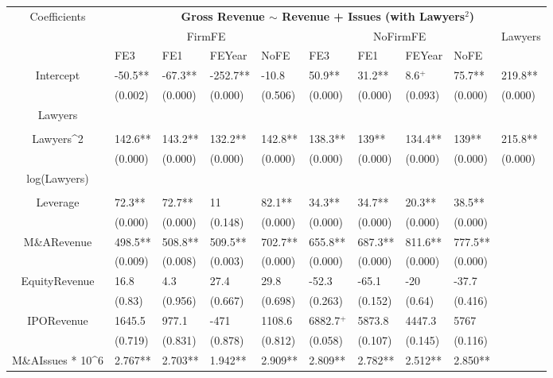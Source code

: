 \documentclass{article}
\begin{document}
\begin{table}[H]
\centering
\begin{tabular}{|clllllllll|}
\hline
\multirow{3}{*}{Coefficients} & \multicolumn{9}{c|}{\textbf{Gross Revenue $\sim$ Revenue + Issues (with Lawyers$^2$)}} \\
\cline{2-10}
& \multicolumn{4}{c}{FirmFE} & \multicolumn{4}{c}{NoFirmFE} & \multirow{2}{*}{Lawyers} \\
\cline{2-9}
& FE3 & FE1 & FEYear & NoFE & FE3 & FE1 & FEYear & NoFE &  \\
\hline
 
Intercept & -50.5** & -67.3** & -252.7** & -10.8 & 50.9** & 31.2** & 8.6$^{+}$ & 75.7** & 219.8** \\ 
   & (0.002) & (0.000) & (0.000) & (0.506) & (0.000) & (0.000) & (0.093) & (0.000) & (0.000) \\ 
  Lawyers &  &  &  &  &  &  &  &  &  \\ 
   &  &  &  &  &  &  &  &  &  \\ 
  Lawyers^2 & 142.6** & 143.2** & 132.2** & 142.8** & 138.3** & 139** & 134.4** & 139** & 215.8** \\ 
   & (0.000) & (0.000) & (0.000) & (0.000) & (0.000) & (0.000) & (0.000) & (0.000) & (0.000) \\ 
  log(Lawyers) &  &  &  &  &  &  &  &  &  \\ 
   &  &  &  &  &  &  &  &  &  \\ 
  Leverage & 72.3** & 72.7** & 11 & 82.1** & 34.3** & 34.7** & 20.3** & 38.5** &  \\ 
   & (0.000) & (0.000) & (0.148) & (0.000) & (0.000) & (0.000) & (0.000) & (0.000) &  \\ 
  M\&ARevenue & 498.5** & 508.8** & 509.5** & 702.7** & 655.8** & 687.3** & 811.6** & 777.5** &  \\ 
   & (0.009) & (0.008) & (0.003) & (0.000) & (0.000) & (0.000) & (0.000) & (0.000) &  \\ 
  EquityRevenue & 16.8 & 4.3 & 27.4 & 29.8 & -52.3 & -65.1 & -20 & -37.7 &  \\ 
   & (0.83) & (0.956) & (0.667) & (0.698) & (0.263) & (0.152) & (0.64) & (0.416) &  \\ 
  IPORevenue & 1645.5 & 977.1 & -471 & 1108.6 & 6882.7$^{+}$ & 5873.8 & 4447.3 & 5767 &  \\ 
   & (0.719) & (0.831) & (0.878) & (0.812) & (0.058) & (0.107) & (0.145) & (0.116) &  \\ 
  M\&AIssues * 10^6 & 2.767** & 2.703** & 1.942** & 2.909** & 2.809** & 2.782** & 2.512** & 2.850** &  \\ 

\end{tabular}
\end{table}
\end{document}
